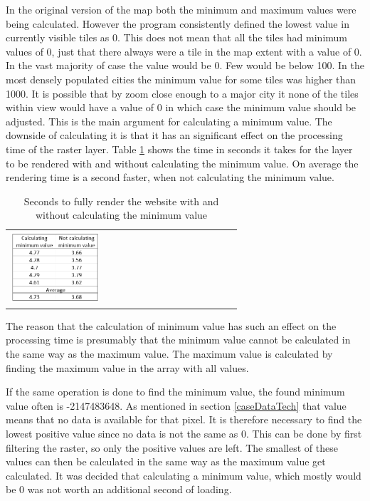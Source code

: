 In the original version of the map both the minimum and maximum values were being calculated. However the program consistently defined the lowest value in currently visible tiles as 0.
This does not mean that all the tiles had minimum values of 0, just that there always were a tile in the map extent with a value of 0. In the vast majority of case the value would be 0. Few would be below 100. In the most densely populated cities the minimum value for some tiles was higher than 1000. 
It is possible that by zoom close enough to a major city it none of the tiles within view would have a value of 0 in which case the minimum value should be adjusted.
This is the main argument for calculating a minimum value. The downside of calculating it is that it has an significant effect on the processing time of the raster layer. Table \ref{tabMinimum} shows the time in seconds it takes for the layer to be rendered with and without calculating the minimum value. On average the rendering time is a second faster, when not calculating the minimum value.
\begin{table}[htbp]
	\centering
	\begin{tabular}{l}
		\includegraphics[width=0.4\textwidth]{Pictures/tabMinimum}
	\end{tabular}
	\caption{Seconds to fully render the website with and without calculating the minimum value}
	\label{tabMinimum}
\end{table}

The reason that the calculation of minimum value has such an effect on the processing time is presumably that the minimum value cannot be calculated in the same way as the maximum value. 
The maximum value is calculated by finding the maximum value in the array with all values. 


If the same operation is done to find the minimum value, the found minimum value often is -2147483648. As mentioned in section \ref{caseDataTech} that value means that no data is available for that pixel. 
It is therefore necessary to find the lowest positive value since no data is not the same as 0. This can be done by first filtering the raster, so only the positive values are left. The smallest of these values can then be calculated in the same way as the maximum value get calculated. 
It was decided that calculating a minimum value, which mostly would be 0 was not worth an additional second of loading. 

